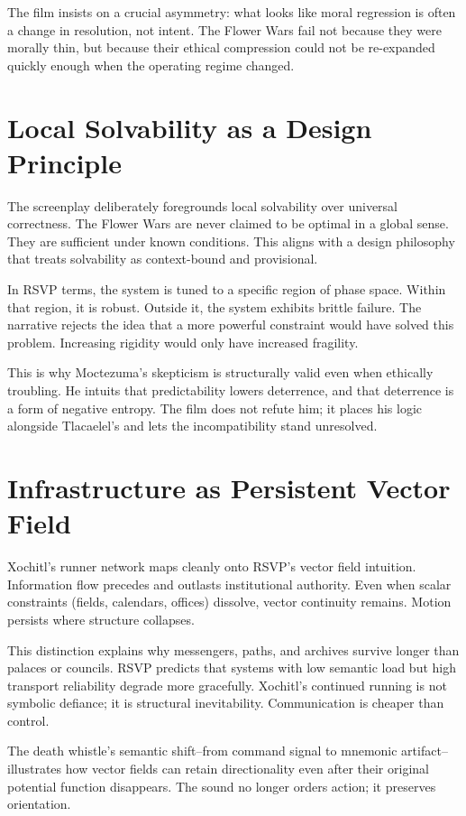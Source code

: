 \documentclass[12pt]{article}
\begin{document}
The film insists on a crucial asymmetry: what looks like moral regression is often a change in resolution, not intent. The Flower Wars fail not because they were morally thin, but because their ethical compression could not be re-expanded quickly enough when the operating regime changed.

\section*{Local Solvability as a Design Principle}

The screenplay deliberately foregrounds local solvability over universal correctness. The Flower Wars are never claimed to be optimal in a global sense. They are sufficient under known conditions. This aligns with a design philosophy that treats solvability as context-bound and provisional.

In RSVP terms, the system is tuned to a specific region of phase space. Within that region, it is robust. Outside it, the system exhibits brittle failure. The narrative rejects the idea that a more powerful constraint would have solved this problem. Increasing rigidity would only have increased fragility.

This is why Moctezuma's skepticism is structurally valid even when ethically troubling. He intuits that predictability lowers deterrence, and that deterrence is a form of negative entropy. The film does not refute him; it places his logic alongside Tlacaelel's and lets the incompatibility stand unresolved.

\section*{Infrastructure as Persistent Vector Field}

Xochitl's runner network maps cleanly onto RSVP's vector field intuition. Information flow precedes and outlasts institutional authority. Even when scalar constraints (fields, calendars, offices) dissolve, vector continuity remains. Motion persists where structure collapses.

This distinction explains why messengers, paths, and archives survive longer than palaces or councils. RSVP predicts that systems with low semantic load but high transport reliability degrade more gracefully. Xochitl's continued running is not symbolic defiance; it is structural inevitability. Communication is cheaper than control.

The death whistle's semantic shift--from command signal to mnemonic artifact--illustrates how vector fields can retain directionality even after their original potential function disappears. The sound no longer orders action; it preserves orientation.
\end{document}

